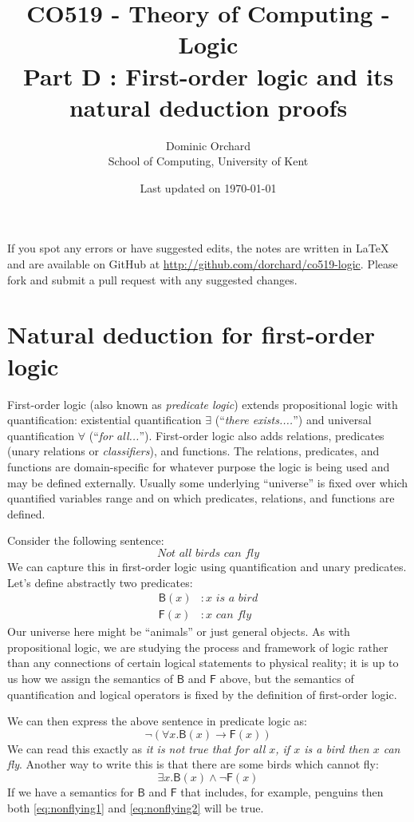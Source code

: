 \documentclass{article}
\title{\vspace{-3em}CO519 - Theory of Computing - Logic \\
  {\large{Part D : First-order logic and its natural deduction
      proofs}}}
\author{Dominic Orchard \\
  {\small{School of Computing, University of Kent}}}
\date{Last updated on \today}
\theoremstyle{definition}
\newcommand{\rel}[1]{\mathsf{#1}}
\begin{document}
\maketitle

\noindent
If you spot any errors or have suggested edits, the notes are written
in LaTeX and are available on GitHub at
\url{http://github.com/dorchard/co519-logic}. Please fork and submit a
pull request with any suggested changes.

\section{Natural deduction for first-order logic}

First-order logic (also known as \emph{predicate logic}) extends
propositional logic with quantification: existential quantification
$\exists$ (``\emph{there exists....}'') and universal quantification
$\forall$ (``\emph{for all...}'').  First-order logic also adds
relations, predicates (unary relations or \emph{classifiers}), and
functions. The relations, predicates, and functions are
domain-specific for whatever purpose the logic is being used and may
be defined externally. Usually some underlying ``universe'' is fixed
over which quantified variables range and on which predicates,
relations, and functions are defined.

Consider the following sentence:
%
\begin{equation*}
  \textit{Not all birds can fly}
\end{equation*}
%
We can capture this in first-order logic using quantification and
unary predicates. Let's define abstractly two predicates:
%
\begin{align*}
  \rel{B}(x) & : \textit{$x$ is a bird} \\
  \rel{F}(x) & : \textit{$x$ can fly}
\end{align*}
%
Our universe here might be ``animals'' or just general objects. As
with propositional logic, we are studying the process and framework of
logic rather than any connections of certain logical statements to
physical reality; it is up to us how we assign the semantics of
$\rel{B}$ and $\rel{F}$ above, but the semantics of quantification and
logical operators is fixed by the definition of first-order logic.

We can then express the above sentence in predicate logic as:
%
\begin{equation}
  \neg (\forall x . \rel{B}(x) \rightarrow \rel{F}(x))
  \label{eq:nonflying1}
\end{equation}
%
We can read this exactly as \emph{it is not true that for all $x$, if
  $x$ is a bird then $x$ can fly}. Another way to write this is 
that there are some birds which cannot fly:
%
\begin{equation}
  \exists x . \rel{B}(x) \wedge \neg \rel{F}(x)
    \label{eq:nonflying2}
\end{equation}
%
If we have a semantics for $\rel{B}$ and $\rel{F}$ that includes, for
example, penguins then both \eqref{eq:nonflying1} and
\eqref{eq:nonflying2} will be true.
\end{document}
